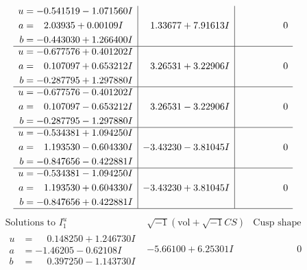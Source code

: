\documentclass[1p]{elsarticle_modified}
\theoremstyle{definition}
\newcommand{\I}{\sqrt{-1}}
\begin{document}
$$\begin{array}{c|c|c}
\begin{aligned}
u &= -0.541519 - 1.071560 I \\
a &= \phantom{-}2.03935 + 0.00109 I \\
b &= -0.443030 + 1.266400 I\end{aligned}
 & \phantom{-}1.33677 + 7.91613 I & \phantom{-0.000000 } 0 \\ \hline\begin{aligned}
u &= -0.677576 + 0.401202 I \\
a &= \phantom{-}0.107097 + 0.653212 I \\
b &= -0.287795 + 1.297880 I\end{aligned}
 & \phantom{-}3.26531 + 3.22906 I & \phantom{-0.000000 } 0 \\ \hline\begin{aligned}
u &= -0.677576 - 0.401202 I \\
a &= \phantom{-}0.107097 - 0.653212 I \\
b &= -0.287795 - 1.297880 I\end{aligned}
 & \phantom{-}3.26531 - 3.22906 I & \phantom{-0.000000 } 0 \\ \hline\begin{aligned}
u &= -0.534381 + 1.094250 I \\
a &= \phantom{-}1.193530 - 0.604330 I \\
b &= -0.847656 - 0.422881 I\end{aligned}
 & -3.43230 - 3.81045 I & \phantom{-0.000000 } 0 \\ \hline\begin{aligned}
u &= -0.534381 - 1.094250 I \\
a &= \phantom{-}1.193530 + 0.604330 I \\
b &= -0.847656 + 0.422881 I\end{aligned}
 & -3.43230 + 3.81045 I & \phantom{-0.000000 } 0\\
 \hline 
 \end{array}$$\newpage$$\begin{array}{c|c|c}  
\text{Solutions to }I^u_{1}& \I (\text{vol} + \sqrt{-1}CS) & \text{Cusp shape}\\
 \hline 
\begin{aligned}
u &= \phantom{-}0.148250 + 1.246730 I \\
a &= -1.46205 - 0.62108 I \\
b &= \phantom{-}0.397250 - 1.143730 I\end{aligned}
 & -5.66100 + 6.25301 I & \phantom{-0.000000 } 0 \\ \hline\begin{aligned}

\end{aligned}
\end{array}$$
\end{document}
